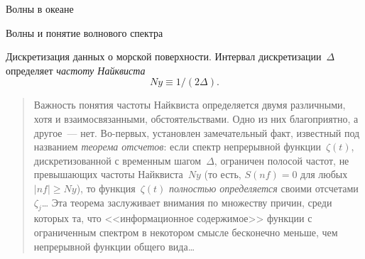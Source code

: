 \begin{chapter}{Волны в океане}
\begin{section}{Волны и понятие волнового спектра}
\begin{paragraph}{Дискретизация данных о морской поверхности.}
Интервал дискретизации~$\Delta $ определяет 
\emph{частоту Найквиста}%
~\cite[стр.~494]{Press:1992}
\begin{equation}
Ny \equiv 1/( 2 \Delta ).
\end{equation}
\begin{quotation}
Важность понятия частоты Найквиста определяется двумя различными, хотя
и взаимосвязанными, обстоятельствами. Одно из них благоприятно, 
а другое~--- нет. Во-первых, установлен замечательный факт, известный
под названием \emph{теорема отсчетов}: если спектр непрерывной 
функции~$\zeta(t)$, дискретизованной с временным шагом~$\Delta $, 
ограничен полосой частот, не превышающих частоты Найквиста~$Ny$ 
(то есть, $S(nf)=0$ для любых~$|nf| \geq Ny$), то функция~$\zeta(t)$ 
\emph{полностью определяется} своими отсчетами~$\zeta _j$\dots{} 
Эта теорема заслуживает внимания по множеству причин, среди которых та,
что <<информационное содержимое>> функции с ограниченным спектром в некотором
смысле бесконечно меньше, чем непрерывной функции общего вида\dots{}
%


\end{quotation}
\end{paragraph}
\end{section}
\end{chapter}
